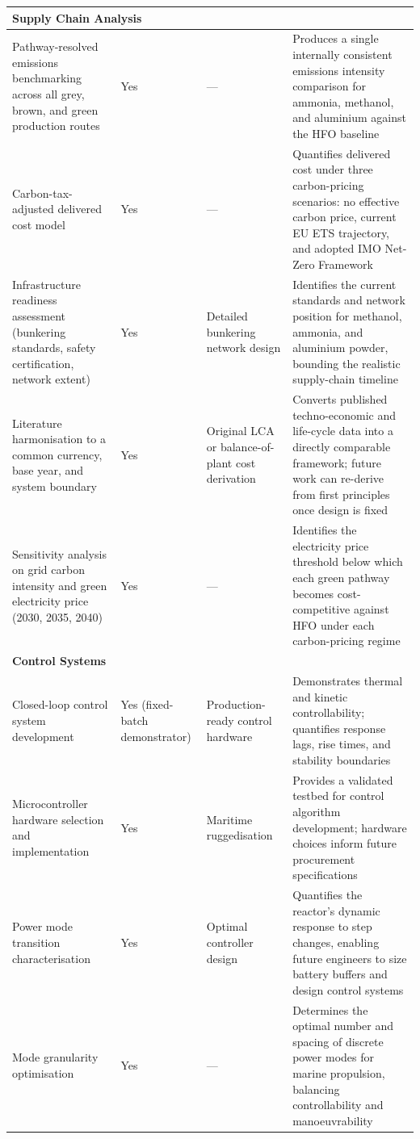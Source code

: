 \documentclass[12pt]{article}
\begin{document}
\begin{longtable}{|p{3.5cm}|p{1.8cm}|p{1.8cm}|p{7.2cm}|}
\multicolumn{4}{|l|}{\textbf{Supply Chain Analysis}} \\
\hline
Pathway-resolved emissions benchmarking across all grey, brown, and green production routes &
Yes & --- &
Produces a single internally consistent emissions intensity comparison for ammonia, methanol, and aluminium against the HFO baseline \\
\hline
Carbon-tax-adjusted delivered cost model &
Yes & --- &
Quantifies delivered cost under three carbon-pricing scenarios: no effective carbon price, current EU ETS trajectory, and adopted IMO Net-Zero Framework \\
\hline
Infrastructure readiness assessment (bunkering standards, safety certification, network extent) &
Yes & Detailed bunkering network design &
Identifies the current standards and network position for methanol, ammonia, and aluminium powder, bounding the realistic supply-chain timeline \\
\hline
Literature harmonisation to a common currency, base year, and system boundary &
Yes & Original LCA or balance-of-plant cost derivation &
Converts published techno-economic and life-cycle data into a directly comparable framework; future work can re-derive from first principles once design is fixed \\
\hline
Sensitivity analysis on grid carbon intensity and green electricity price (2030, 2035, 2040) &
Yes & --- &
Identifies the electricity price threshold below which each green pathway becomes cost-competitive against HFO under each carbon-pricing regime \\
\hline

\multicolumn{4}{|l|}{\textbf{Control Systems}} \\
\hline
Closed-loop control system development &
Yes (fixed-batch demonstrator) & Production-ready control hardware &
Demonstrates thermal and kinetic controllability; quantifies response lags, rise times, and stability boundaries \\
\hline
Microcontroller hardware selection and implementation &
Yes & Maritime ruggedisation &
Provides a validated testbed for control algorithm development; hardware choices inform future procurement specifications \\
\hline
Power mode transition characterisation &
Yes & Optimal controller design &
Quantifies the reactor's dynamic response to step changes, enabling future engineers to size battery buffers and design control systems \\
\hline
Mode granularity optimisation &
Yes & --- &
Determines the optimal number and spacing of discrete power modes for marine propulsion, balancing controllability and manoeuvrability \\
\hline


\end{longtable}
\end{document}
